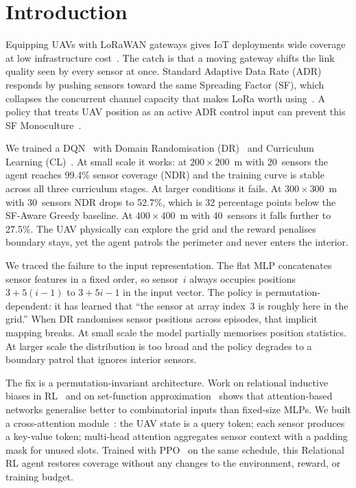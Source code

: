 \documentclass[conference]{IEEEtran}
\begin{document}
\section{Introduction}

Equipping UAVs with LoRaWAN gateways gives IoT deployments wide coverage at low infrastructure cost~\cite{wei2022uav,zeng2016wireless,mozaffari2019tutorial}. The catch is that a moving gateway shifts the link quality seen by every sensor at once. Standard Adaptive Data Rate (ADR) responds by pushing sensors toward the same Spreading Factor (SF), which collapses the concurrent channel capacity that makes LoRa worth using~\cite{zorbas2025revisiting,bor2016lora,augustin2016lora}. A policy that treats UAV position as an active ADR control input can prevent this SF Monoculture~\cite{zorbas2025revisiting,xiong2023flyinglora}.

We trained a DQN~\cite{mnih2015humanlevel} with Domain Randomisation (DR)~\cite{tobin2017domain} and Curriculum Learning (CL)~\cite{bengio2009curriculum}. At small scale it works: at $200{\times}200$~m with 20~sensors the agent reaches 99.4\% sensor coverage (NDR) and the training curve is stable across all three curriculum stages. At larger conditions it fails. At $300{\times}300$~m with 30~sensors NDR drops to 52.7\%, which is 32 percentage points below the SF-Aware Greedy baseline. At $400{\times}400$~m with 40~sensors it falls further to 27.5\%. The UAV physically can explore the grid and the reward penalises boundary stays, yet the agent patrols the perimeter and never enters the interior.

We traced the failure to the input representation. The flat MLP concatenates sensor features in a fixed order, so sensor~$i$ always occupies positions $3{+}5(i{-}1)$ to $3{+}5i{-}1$ in the input vector. The policy is permutation-dependent: it has learned that ``the sensor at array index~3 is roughly here in the grid.'' When DR randomises sensor positions across episodes, that implicit mapping breaks. At small scale the model partially memorises position statistics. At larger scale the distribution is too broad and the policy degrades to a boundary patrol that ignores interior sensors.

The fix is a permutation-invariant architecture. Work on relational inductive biases in RL~\cite{zambaldi2018relational} and on set-function approximation~\cite{zaheer2017deepsets} shows that attention-based networks generalise better to combinatorial inputs than fixed-size MLPs. We built a cross-attention module~\cite{vaswani2017attention}: the UAV state is a query token; each sensor produces a key-value token; multi-head attention aggregates sensor context with a padding mask for unused slots. Trained with PPO~\cite{schulman2017proximal} on the same schedule, this Relational RL agent restores coverage without any changes to the environment, reward, or training budget.
\end{document}

